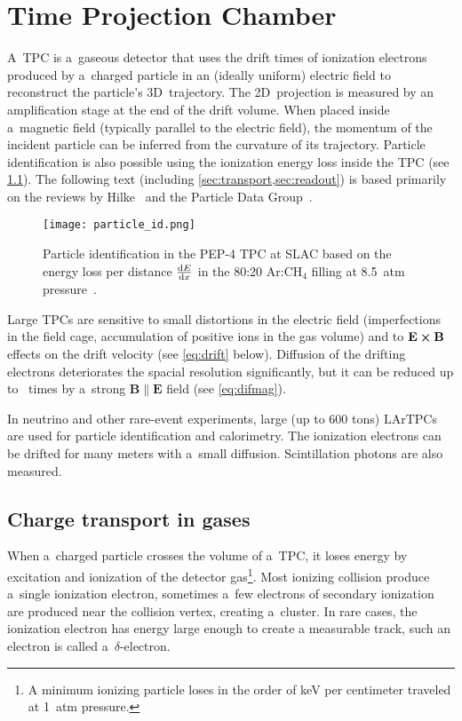 \chapter{Time Projection Chamber}
\label{sec:tpc}
	A~\acf{TPC} is a~gaseous detector that uses the drift times of ionization electrons produced by a~charged particle in an (ideally uniform) electric field to reconstruct the particle's 3D~trajectory. The 2D~projection is measured by an amplification stage at the end of the drift volume. When placed inside a~magnetic field (typically parallel to the electric field), the momentum of the incident particle can be inferred from the curvature of its trajectory. Particle identification is also possible using the ionization energy loss inside the \ac{TPC} (see \cref{fig:particleid}). The following text (including \cref{sec:transport,sec:readout}) is based primarily on the reviews by Hilke~\cite{TPCs} and the Particle Data Group~\cite{pdg2024}.
	
	\begin{figure}[H]
		\centering
		\texttt{[image: particle\_id.png]}
		\caption{Particle identification in the PEP-4 \ac{TPC} at SLAC based on the energy loss per distance $\dv{E}{x}$ in the 80:20 Ar:CH$_4$ filling at \qty{8.5}{atm} pressure~\cite{pid_og,particleid}.}
		\label{fig:particleid}
	\end{figure}
	
	Large \acp{TPC} are sensitive to small distortions in the electric field (imperfections in the field cage, accumulation of positive ions in the gas volume) and to $\mathbf{E}\cross\mathbf{B}$ effects on the drift velocity (see \cref{eq:drift} below). Diffusion of the drifting electrons deteriorates the spacial resolution significantly, but it can be reduced up to ~times by a~strong $\mathbf{B}\parallel\mathbf{E}$ field (see \cref{eq:difmag}).
	
	In neutrino and other rare-event experiments, large (up to 600 tons) \acp{LArTPC} are used for particle identification and calorimetry. The ionization electrons can be drifted for many meters with a~small diffusion. Scintillation photons are also measured.
	
	\section{Charge transport in gases}
	\label{sec:transport}
		When a~charged particle crosses the volume of a~\ac{TPC}, it loses energy by excitation and ionization of the detector gas\footnote{A minimum ionizing particle loses in the order of \unit{\keV} per centimeter traveled at \qty{1}{atm} pressure.}. Most ionizing collision produce a~single ionization electron, sometimes a~few electrons of secondary ionization are produced near the collision vertex, creating a~cluster. In rare cases, the ionization electron has energy large enough to create a measurable track, such an electron is called a~$\delta$\nobreakdash-electron.
		
